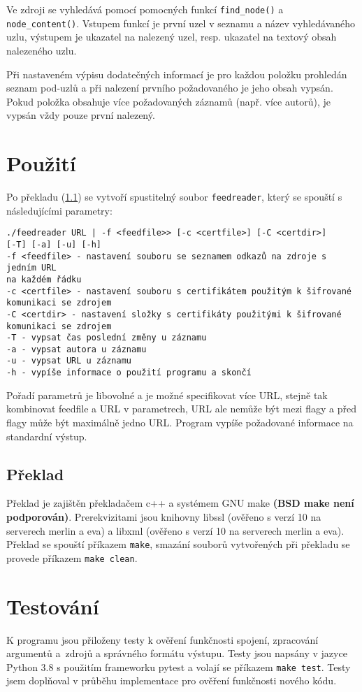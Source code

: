 Ve zdroji se vyhledává pomocí pomocných funkcí \texttt{find\_node()} a \texttt{node\_content()}. Vstupem funkcí je první uzel v seznamu a název vyhledávaného uzlu, výstupem je ukazatel na nalezený uzel, resp. ukazatel na textový obsah nalezeného uzlu.

Při nastaveném výpisu dodatečných informací je pro každou položku prohledán seznam pod-uzlů a při nalezení prvního požadovaného je jeho obsah vypsán. Pokud položka obsahuje více požadovaných záznamů (např. více autorů), je vypsán vždy pouze první nalezený.

\chapter{Použití}
Po překladu (\ref{preklad}) se vytvoří spustitelný soubor \texttt{feedreader}, který se spouští s následujícími parametry:
\begin{verbatim}
./feedreader URL | -f <feedfile>> [-c <certfile>] [-C <certdir>]
[-T] [-a] [-u] [-h]
-f <feedfile> - nastavení souboru se seznamem odkazů na zdroje s jedním URL
na každém řádku
-c <certfile> - nastavení souboru s certifikátem použitým k šifrované
komunikaci se zdrojem
-C <certdir> - nastavení složky s certifikáty použitými k šifrované
komunikaci se zdrojem
-T - vypsat čas poslední změny u záznamu
-a - vypsat autora u záznamu
-u - vypsat URL u záznamu
-h - vypíše informace o použití programu a skončí
\end{verbatim}

Pořadí parametrů je libovolné a je možné specifikovat více URL, stejně tak kombinovat feedfile a URL v parametrech, URL ale nemůže být mezi flagy a před flagy může být maximálně jedno URL. Program vypíše požadované informace na standardní výstup.

\section{Překlad} \label{preklad}
Překlad je zajištěn překladačem c++ a systémem GNU make \textbf{(BSD make není podporován)}. Prerekvizitami jsou knihovny libssl (ověřeno s verzí 10 na serverech merlin a eva) a libxml (ověřeno s verzí 10 na serverech merlin a eva). Překlad se spouští příkazem \texttt{make}, smazání souborů vytvořených při překladu se provede příkazem \texttt{make clean}.

\chapter{Testování}
K programu jsou přiloženy testy k ověření funkčnosti spojení, zpracování argumentů a~zdrojů a správného formátu výstupu. Testy jsou napsány v jazyce Python 3.8 s použitím frameworku pytest \cite{pytest} a volají se příkazem \texttt{make test}. Testy jsem doplňoval v průběhu implementace pro ověření funkčnosti nového kódu.

